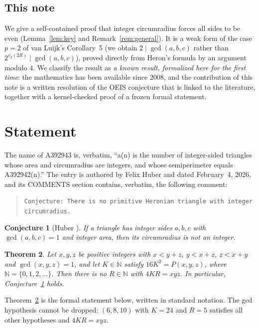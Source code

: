 \documentclass[11pt]{amsart}
\theoremstyle{plain}
\newtheorem{theorem}{Theorem}
\newtheorem{conjecture}[theorem]{Conjecture}
\theoremstyle{definition}
\newcommand{\N}{\mathbb{N}}
\begin{document}
\subsection*{This note}
We give a self-contained proof that integer circumradius forces all sides to be even (Lemma~\ref{lem:key} and Remark~\ref{rem:general}). It is a weak form of the case $p=2$ of van Luijk's Corollary~5 (we obtain $2\mid\gcd(a,b,c)$ rather than $2^{v_2(2R)}\mid\gcd(a,b,c)$), proved directly from Heron's formula by an argument modulo $4$. We classify the result as \emph{a known result, formalized here for the first time}: the mathematics has been available since 2008, and the contribution of this note is a written resolution of the OEIS conjecture that is linked to the literature, together with a kernel-checked proof of a frozen formal statement.

\section{Statement}\label{sec:statement}

The name of A392943 \cite{A392943} is, verbatim, ``a(n) is the number of integer-sided triangles whose area and circumradius are integers, and whose semiperimeter equals A392942(n).'' The entry is authored by Felix Huber and dated February~4, 2026, and its COMMENTS section contains, verbatim, the following comment:
\begin{quote}\raggedright
\texttt{Conjecture: There is no primitive Heronian triangle with integer circumradius.}
\end{quote}

\begin{conjecture}[Huber \cite{A392943}]\label{conj}
If a triangle has integer sides $a,b,c$ with $\gcd(a,b,c)=1$ and integer area, then its circumradius is not an integer.
\end{conjecture}

\begin{theorem}\label{thm:main}
Let $x,y,z$ be positive integers with $x<y+z$, $y<x+z$, $z<x+y$ and $\gcd(x,y,z)=1$, and let $K\in\N$ satisfy $16K^2=P(x,y,z)$, where $\N=\{0,1,2,\dots\}$. Then there is no $R\in\N$ with $4KR=xyz$. In particular, Conjecture~\ref{conj} holds.
\end{theorem}

Theorem~\ref{thm:main} is the formal statement below, written in standard notation. The gcd hypothesis cannot be dropped: $(6,8,10)$ with $K=24$ and $R=5$ satisfies all other hypotheses and $4KR=xyz$.
\end{document}
